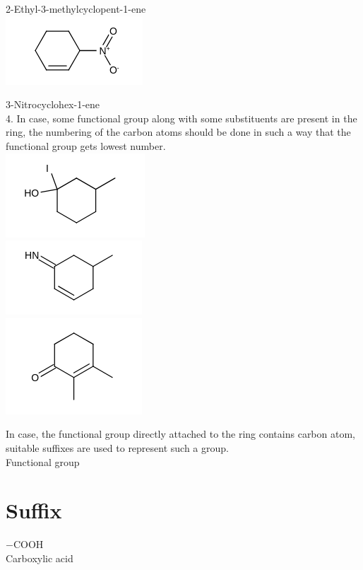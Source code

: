 \documentclass[10pt]{article}
\begin{document}
2-Ethyl-3-methylcyclopent-1-ene\\
\includegraphics{smile-f7270e7bfdbcb4980be3332cd85b5b0a8170c5c3}

3-Nitrocyclohex-1-ene\\
4. In case, some functional group along with some substituents are present in the ring, the numbering of the carbon atoms should be done in such a way that the functional group gets lowest number.\\
\includegraphics{smile-aac330458a46b81bd404a3e9b503858f8fae4bef}\\
\includegraphics{smile-db6cd7f04f959bd23a77f49b3a41df698f4dc721}\\
\includegraphics{smile-1bdf190fb6b41ee6e33b83c7ad0b904ed5e138da}

In case, the functional group directly attached to the ring contains carbon atom, suitable suffixes are used to represent such a group.\\
Functional group

\section*{Suffix}
$-\mathrm{COOH}$\\
Carboxylic acid
\end{document}
